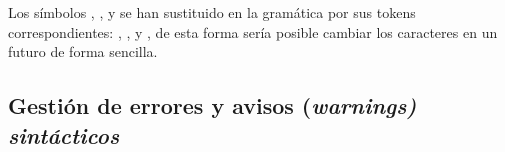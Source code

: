 \documentclass[../main.tex]{subfiles}
\begin{document}
Los símbolos \car{,}, \car{;}, \car{(} y \car{)}  se han sustituido en la gramática por sus tokens correspondientes: , ,  y , de esta forma sería posible cambiar los caracteres en un futuro de forma sencilla.

\subsection{Gestión de errores y avisos (\it{warnings}) sintácticos}
\end{document}
